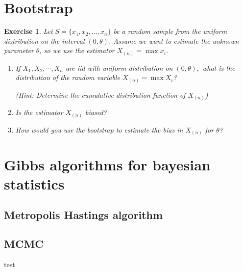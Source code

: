 \documentclass{article}\usepackage[]{graphicx}\usepackage[]{xcolor}
\newtheorem{exercise}{Exercise}
\begin{document}
\section{Bootstrap}

\begin{exercise}
Let $S = \lbrace x_1, x_2, \ldots, x_n \rbrace$ be a random sample from the uniform distribution on the interval $(0, \theta)$. Assume we want to estimate the unknown parameter $\theta$, so we use the estimator $X_{(n)} = \max x_i$.

\begin{enumerate}
\item If $X_1,X_2,\cdots, X_n$ are iid with uniform distribution on $(0,\theta),$ what is the distribution of the random variable $X_{(n)} = \max X_i$? 

(Hint: Determine the cumulative distribution function of $X_{(n)}$)

\item Is the estimator $X_{(n)}$ biased?

\item How would you use the bootstrap to estimate the bias in $X_{(n)}$ for $\theta$?
\end{enumerate}

\end{exercise}


\section{Gibbs algorithms for bayesian statistics}

\subsection{Metropolis Hastings algorithm}

\subsection{MCMC}


\newpage
test


\end{document}
